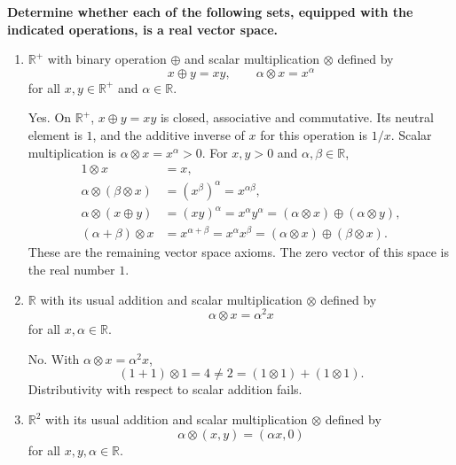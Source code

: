 \providecommand{\rank}{\operatorname{r}}
\providecommand{\RR}{\mathbb R}
\providecommand{\CC}{\mathbb C}
\providecommand{\KK}{\mathbb K}

\setcounter{enumi}{58}
\item {\bfseries\boldmath
Determine whether each of the following sets, equipped with the indicated operations, is a real vector space.
}

\begin{enumerate}[label=\alph*)]

\item $\RR^+$ with binary operation $\oplus$ and scalar multiplication $\otimes$ defined by
\[
x\oplus y=xy,\qquad\alpha\otimes x=x^\alpha
\]
for all $x,y\in\RR^+$ and $\alpha\in\RR$.

\begin{answer}
Yes. On $\RR^+$, $x\oplus y=xy$ is closed, associative and commutative.
Its neutral element is $1$, and the additive inverse of $x$ for this operation
is $1/x$. Scalar multiplication is $\alpha\otimes x=x^\alpha>0$. For
$x,y>0$ and $\alpha,\beta\in\RR$,
\[
\begin{aligned}
 1\otimes x&=x,\\
 \alpha\otimes(\beta\otimes x)&=(x^\beta)^\alpha=x^{\alpha\beta},\\
 \alpha\otimes(x\oplus y)&=(xy)^\alpha=x^\alpha y^\alpha
   =(\alpha\otimes x)\oplus(\alpha\otimes y),\\
 (\alpha+\beta)\otimes x&=x^{\alpha+\beta}=x^\alpha x^\beta
   =(\alpha\otimes x)\oplus(\beta\otimes x).
\end{aligned}
\]
These are the remaining vector space axioms. The zero vector of this space
is the real number $1$.
\end{answer}

\item $\RR$ with its usual addition and scalar multiplication $\otimes$ defined by
\[
\alpha\otimes x=\alpha^2x
\]
for all $x,\alpha\in\RR$.

\begin{answer}
No. With $\alpha\otimes x=\alpha^2x$,
\[
 (1+1)\otimes1=4\ne2=(1\otimes1)+(1\otimes1).
\]
Distributivity with respect to scalar addition fails.
\end{answer}

\item $\RR^2$ with its usual addition and scalar multiplication $\otimes$ defined by
\[
\alpha\otimes(x,y)=(\alpha x,0)
\]
for all $x,y,\alpha\in\RR$.


\end{enumerate}
